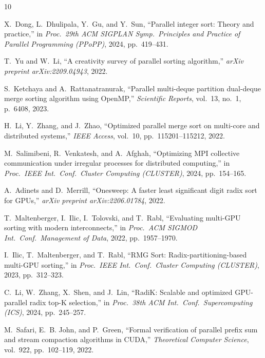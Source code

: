 \documentclass[conference]{IEEEtran}
\begin{document}
\begin{thebibliography}{10}

X.~Dong, L.~Dhulipala, Y.~Gu, and Y.~Sun,
``Parallel integer sort: Theory and practice,''
in \textit{Proc.\ 29th ACM SIGPLAN Symp.\ Principles and Practice of Parallel Programming (PPoPP)}, 2024, pp.~419--431.

T.~Yu and W.~Li,
``A creativity survey of parallel sorting algorithm,''
\textit{arXiv preprint arXiv:2209.04943}, 2022.

S.~Ketchaya and A.~Rattanatranurak,
``Parallel multi-deque partition dual-deque merge sorting algorithm using OpenMP,''
\textit{Scientific Reports}, vol.~13, no.~1, p.~6408, 2023.

H.~Li, Y.~Zhang, and J.~Zhao,
``Optimized parallel merge sort on multi-core and distributed systems,''
\textit{IEEE Access}, vol.~10, pp.~115201--115212, 2022.

M.~Salimibeni, R.~Venkatesh, and A.~Afghah,
``Optimizing MPI collective communication under irregular processes for distributed computing,''
in \textit{Proc.\ IEEE Int.\ Conf.\ Cluster Computing (CLUSTER)}, 2024, pp.~154--165.

A.~Adinets and D.~Merrill,
``Onesweep: A faster least significant digit radix sort for GPUs,''
\textit{arXiv preprint arXiv:2206.01784}, 2022.

T.~Maltenberger, I.~Ilic, I.~Tolovski, and T.~Rabl,
``Evaluating multi-GPU sorting with modern interconnects,''
in \textit{Proc.\ ACM SIGMOD Int.\ Conf.\ Management of Data}, 2022, pp.~1957--1970.

I.~Ilic, T.~Maltenberger, and T.~Rabl,
``RMG Sort: Radix-partitioning-based multi-GPU sorting,''
in \textit{Proc.\ IEEE Int.\ Conf.\ Cluster Computing (CLUSTER)}, 2023, pp.~312--323.

C.~Li, W.~Zhang, X.~Shen, and J.~Lin,
``RadiK: Scalable and optimized GPU-parallel radix top-K selection,''
in \textit{Proc.\ 38th ACM Int.\ Conf.\ Supercomputing (ICS)}, 2024, pp.~245--257.

M.~Safari, E.~B. John, and P.~Green,
``Formal verification of parallel prefix sum and stream compaction algorithms in CUDA,''
\textit{Theoretical Computer Science}, vol.~922, pp.~102--119, 2022.

\end{thebibliography}
\end{document}
